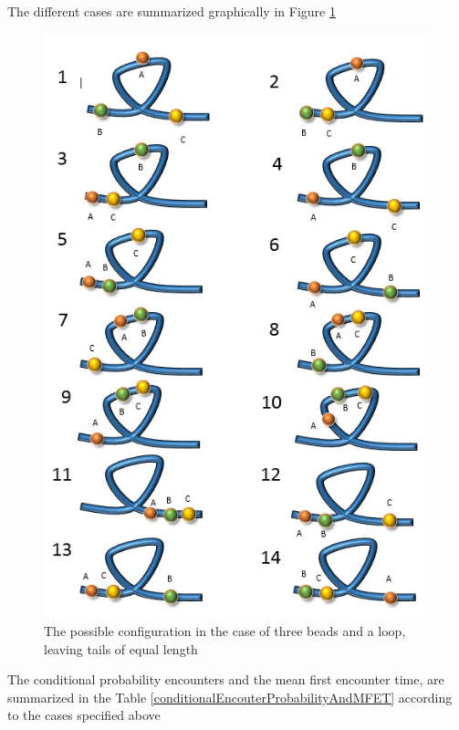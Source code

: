 \documentclass[12pt]{paper}
\begin{document}
The different cases are summarized graphically in Figure \ref{possibleArrangementOfThreeBeadsAndAloop}
\begin{figure}[H]
 \includegraphics[scale=0.5]{possibleArrangementOfThreeBeadsAndAloop.jpg}
 \caption{\scriptsize{The possible configuration in the case of three beads and a loop, leaving tails of equal length}}\label{possibleArrangementOfThreeBeadsAndAloop}
\end{figure}
The conditional probability encounters and the mean first encounter time, are summarized in the Table \ref{conditionalEncouterProbabilityAndMFET}
according to the cases specified above
\end{document}
